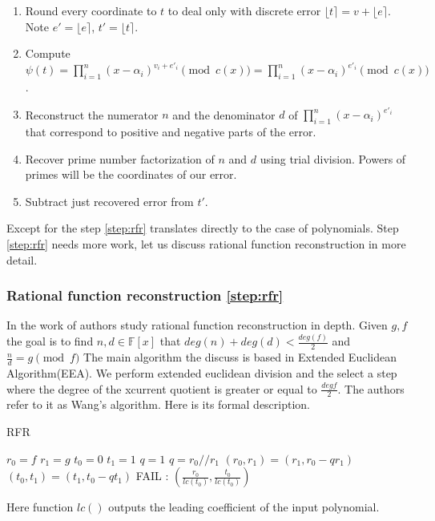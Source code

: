 \documentclass[12pt]{article}
\begin{document}
\begin{enumerate}
    \item Round every coordinate to $t$ to deal only with discrete error $\lfloor t \rceil = v + \lfloor e \rceil$. Note $e' = \lfloor e \rceil$, $t' = \lfloor t \rceil$.
    \item Compute $\psi(t) = \prod_{i=1}^{n}(x - \alpha_{i})^{v_{i} + e'_i} \pmod{c(x)} = \prod_{i=1}^{n}(x - \alpha_{i})^{e'_i} \pmod{c(x)}$.
    \item \label{step:rfr} Reconstruct the numerator $n$ and the denominator $d$ of $\prod_{i=1}^{n}(x - \alpha_{i})^{e'_i}$ that correspond to positive and negative parts of the error.
    \item Recover prime number factorization of $n$ and $d$ using trial division. Powers of primes will be the coordinates of our error.
    \item Subtract just recovered error from $t'$.
\end{enumerate}

Except for the step \ref{step:rfr} translates directly to the case of polynomials. Step \ref{step:rfr} needs more work, let us discuss rational function reconstruction in more detail.

\subsubsection{Rational function reconstruction \ref{step:rfr}}
\label{subsubsec:rfr}
In the work of \cite{[KM06]} authors study rational function reconstruction in depth.  Given $g,f$ the goal is to find $n, d \in \mathbb{F}[x]$ that $deg(n) + deg(d) < \frac{deg(f)}{2}$ and $\frac{n}{d} = g \pmod{f}$ The main algorithm the discuss is based in Extended Euclidean Algorithm(EEA). We perform extended euclidean division and the select a step where the degree of the xcurrent quotient is greater or equal to $\frac{deg f}{2}$. The authors refer to it as Wang's algorithm. Here is its formal description.

\begin{algorithm}
\caption{RFR}\label{RFR}
\begin{algorithmic}[1]
    \State $r_0 = f$  $r_1 = g$
    \State $t_0 = 0$  $t_1 = 1$
    \State $q = 1$
        \State $q = r_0 // r_1$
        \State $(r_0, r_1) = (r_1, r_0 - qr_1)$
        \State $(t_0, t_1) = (t_1, t_0 - qt_1)$
    \EndWhile
        \State \Return FAIL
    \Else:
            \State \Return  $(\frac{r_0}{lc(t_0)}, \frac{t_0}{lc(t_0)})$
    \EndIf
\EndProcedure
\end{algorithmic}
\end{algorithm}
Here function $lc()$ outputs the leading coefficient of the input polynomial.
\end{document}
